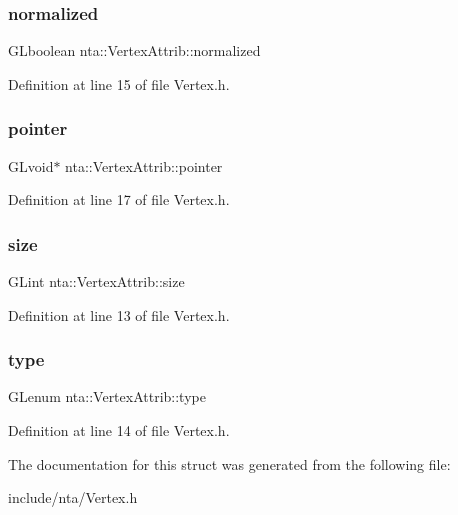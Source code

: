 \subsubsection{\texorpdfstring{normalized}{normalized}}
{\footnotesize\ttfamily G\+Lboolean nta\+::\+Vertex\+Attrib\+::normalized}



Definition at line 15 of file Vertex.\+h.

\mbox{\label{structnta_1_1VertexAttrib_a926cbe1d958dd6e72ad7f93e8791d9a4}} 
\subsubsection{\texorpdfstring{pointer}{pointer}}
{\footnotesize\ttfamily G\+Lvoid$\ast$ nta\+::\+Vertex\+Attrib\+::pointer}



Definition at line 17 of file Vertex.\+h.

\mbox{\label{structnta_1_1VertexAttrib_afd253a525c4d086bcc2afa66a2d0118e}} 
\subsubsection{\texorpdfstring{size}{size}}
{\footnotesize\ttfamily G\+Lint nta\+::\+Vertex\+Attrib\+::size}



Definition at line 13 of file Vertex.\+h.

\mbox{\label{structnta_1_1VertexAttrib_a625cbe8f28739965a9ec29b9a426465e}} 
\subsubsection{\texorpdfstring{type}{type}}
{\footnotesize\ttfamily G\+Lenum nta\+::\+Vertex\+Attrib\+::type}



Definition at line 14 of file Vertex.\+h.



The documentation for this struct was generated from the following file\+:\begin{DoxyCompactItemize}
\item 
include/nta/Vertex.\+h\end{DoxyCompactItemize}
